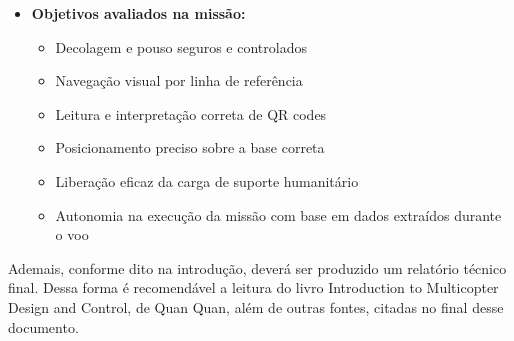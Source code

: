 \begin{itemize}
\begin{itemize}
        \item \textbf{Objetivos avaliados na missão:} 
        \begin{itemize}
            \item Decolagem e pouso seguros e controlados
            \item Navegação visual por linha de referência
            \item Leitura e interpretação correta de QR codes
            \item Posicionamento preciso sobre a base correta
            \item Liberação eficaz da carga de suporte humanitário
            \item Autonomia na execução da missão com base em dados extraídos durante o voo
        \end{itemize}
    \end{itemize}
\end{itemize}

Ademais, conforme dito na introdução, deverá ser produzido um relatório técnico final. Dessa forma é recomendável a leitura do livro Introduction to Multicopter Design and Control, de Quan Quan, além de outras fontes, citadas no final desse documento.